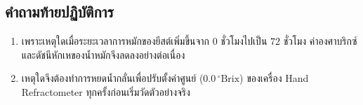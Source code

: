 \subsection{คำถามท้ายปฏิบัติการ}
\begin{enumerate}
    \item เพราะเหตุใดเมื่อระยะเวลาการหมักของยีสต์เพิ่มขึ้นจาก $0$ ชั่วโมงไปเป็น $72$ ชั่วโมง ค่าองศาบริกซ์และดัชนีหักเหของน้ำหมักจึงลดลงอย่างต่อเนื่อง
    \item เหตุใดจึงต้องทำการหยดน้ำกลั่นเพื่อปรับตั้งค่าศูนย์ ($0.0\,^\circ\text{Brix}$) ของเครื่อง Hand Refractometer ทุกครั้งก่อนเริ่มวัดตัวอย่างจริง
\end{enumerate}

